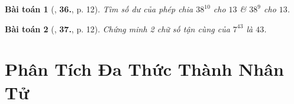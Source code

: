 \documentclass{article}
\numberwithin{equation}{section}
\newtheorem{baitoan}{Bài toán}
\begin{document}
\begin{baitoan}[\cite{Tuyen_Toan_8}, \textbf{36.}, p. 12]
	Tìm số dư của phép chia $38^{10}$ cho $13$ \& $38^9$ cho $13$.
\end{baitoan}

\begin{baitoan}[\cite{Tuyen_Toan_8}, \textbf{37.}, p. 12]
	Chứng minh 2 chữ số tận cùng của $7^{43}$ là $43$.
\end{baitoan}


\section{Phân Tích Đa Thức Thành Nhân Tử}


\printbibliography[heading=bibintoc]
	
\end{document}
